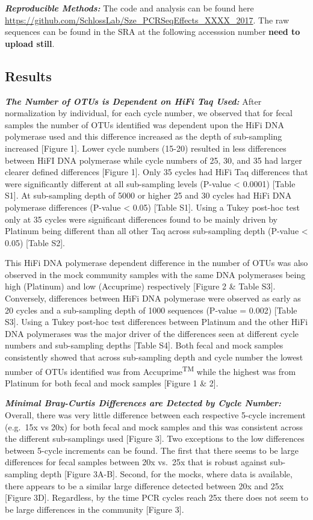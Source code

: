 \documentclass[12pt,]{article}
\begin{document}
\textbf{\emph{Reproducible Methods:}} The code and analysis can be found
here \url{https://github.com/SchlossLab/Sze_PCRSeqEffects_XXXX_2017}.
The raw sequences can be found in the SRA at the following accesssion
number \textbf{need to upload still}.

\newpage

\subsection{Results}\label{results}

\textbf{\emph{The Number of OTUs is Dependent on HiFi Taq Used:}} After
normalization by individual, for each cycle number, we observed that for
fecal samples the number of OTUs identified was dependent upon the HiFi
DNA polymerase used and this difference increased as the depth of
sub-sampling increased {[}Figure 1{]}. Lower cycle numbers (15-20)
resulted in less differences between HiFI DNA polymerase while cycle
numbers of 25, 30, and 35 had larger clearer defined differences
{[}Figure 1{]}. Only 35 cycles had HiFi Taq differences that were
significantly different at all sub-sampling levels (P-value \textless{}
0.0001) {[}Table S1{]}. At sub-sampling depth of 5000 or higher 25 and
30 cycles had HiFi DNA polymerase differences (P-value \textless{} 0.05)
{[}Table S1{]}. Using a Tukey post-hoc test only at 35 cycles were
significant differences found to be mainly driven by Platinum being
different than all other Taq across sub-sampling depth (P-value
\textless{} 0.05) {[}Table S2{]}.

This HiFi DNA polymerase dependent difference in the number of OTUs was
also observed in the mock community samples with the same DNA
polymerases being high (Platinum) and low (Accuprime) respectively
{[}Figure 2 \& Table S3{]}. Conversely, differences between HiFi DNA
polymerase were observed as early as 20 cycles and a sub-sampling depth
of 1000 sequences (P-value = 0.002) {[}Table S3{]}. Using a Tukey
post-hoc test differences between Platinum and the other HiFi DNA
polymerases was the major driver of the differences seen at different
cycle numbers and sub-sampling depths {[}Table S4{]}. Both fecal and
mock samples consistently showed that across sub-sampling depth and
cycle number the lowest number of OTUs identified was from
Accuprime\textsuperscript{TM} while the highest was from Platinum for
both fecal and mock samples {[}Figure 1 \& 2{]}.

\textbf{\emph{Minimal Bray-Curtis Differences are Detected by Cycle
Number:}} Overall, there was very little difference between each
respective 5-cycle increment (e.g.~15x vs 20x) for both fecal and mock
samples and this was consistent across the different sub-samplings used
{[}Figure 3{]}. Two exceptions to the low differences between 5-cycle
increments can be found. The first that there seems to be large
differences for fecal samples between 20x vs.~25x that is robust against
sub-sampling depth {[}Figure 3A-B{]}. Second, for the mocks, where data
is available, there appears to be a similar large difference detected
between 20x and 25x {[}Figure 3D{]}. Regardless, by the time PCR cycles
reach 25x there does not seem to be large differences in the community
{[}Figure 3{]}.
\end{document}
